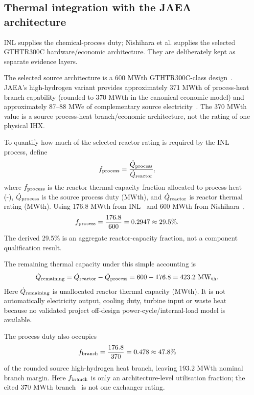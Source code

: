 \subsection{Thermal integration with the JAEA architecture}
INL supplies the chemical-process duty; Nishihara et al. supplies the selected GTHTR300C hardware/economic architecture. They are deliberately kept as separate evidence layers.

The selected source architecture is a 600 MWth GTHTR300C-class design~\cite{nishihara2007potential}. JAEA's high-hydrogen variant provides approximately 371 MWth of process-heat branch capability (rounded to 370 MWth in the canonical economic model) and approximately 87--88 MWe of complementary source electricity~\cite{nishihara2007potential}. The 370 MWth value is a source process-heat branch/economic architecture, not the rating of one physical IHX.

To quantify how much of the selected reactor rating is required by the INL process, define
\begin{equation}\label{eq:reactor-process-fraction}
f_{\rm process}=\frac{\dot Q_{\rm process}}{\dot Q_{\rm reactor}},
\end{equation}
where $f_{\rm process}$ is the reactor thermal-capacity fraction allocated to process heat (-), $\dot Q_{\rm process}$ is the source process duty (MWth), and $\dot Q_{\rm reactor}$ is reactor thermal rating (MWth). Using 176.8 MWth from INL~\cite{inltev961} and 600 MWth from Nishihara~\cite{nishihara2007potential},
\begin{equation}\label{eq:reactor-process-fraction-sub}
f_{\rm process}=\frac{176.8}{600}=0.2947\approx29.5\%.
\end{equation}
The derived 29.5\% is an aggregate reactor-capacity fraction, not a component qualification result.

The remaining thermal capacity under this simple accounting is
\begin{equation}\label{eq:remaining-thermal}
\dot Q_{\rm remaining}=\dot Q_{\rm reactor}-\dot Q_{\rm process}
=600-176.8=423.2~\mathrm{MW_{th}}.
\end{equation}
Here $\dot Q_{\rm remaining}$ is unallocated reactor thermal capacity (MWth). It is not automatically electricity output, cooling duty, turbine input or waste heat because no validated project off-design power-cycle/internal-load model is available.

The process duty also occupies
\begin{equation}\label{eq:branch-utilisation}
f_{\rm branch}=\frac{176.8}{370}=0.478\approx47.8\%
\end{equation}
of the rounded source high-hydrogen heat branch, leaving 193.2 MWth nominal branch margin. Here $f_{\rm branch}$ is only an architecture-level utilisation fraction; the cited 370 MWth branch~\cite{nishihara2007potential} is not one exchanger rating.


